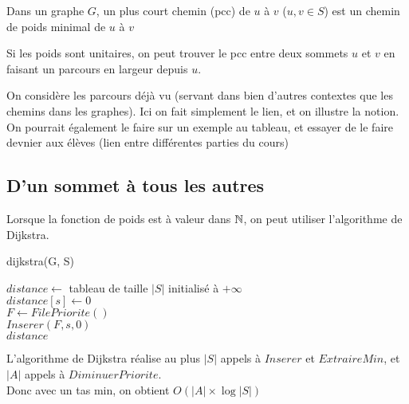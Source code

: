 \begin{definition}
	Dans un graphe $G$, un plus court chemin (pcc) de $u$ à $v$ ($u,v\in S$) est un chemin de poids minimal de $u$ à $v$
\end{definition}

\begin{rem}
	Si les poids sont unitaires, on peut trouver le pcc entre deux sommets $u$ et $v$ en faisant un parcours en largeur depuis $u$.
\end{rem}

\begin{com}
	On considère les parcours déjà vu (servant dans bien d'autres contextes que les chemins dans les graphes). Ici on fait simplement le lien, et on illustre la notion. On pourrait également le faire sur un exemple au tableau, et essayer de le faire devnier aux élèves (lien entre différentes parties du cours)
\end{com}

\subsection{D'un sommet à tous les autres}

Lorsque la fonction de poids est à valeur dans $\mathbb{N}$, on peut utiliser l'algorithme de Dijkstra.

\begin{algo}
	\begin{algorithm}
		\caption{dijkstra(G, S)}
		$distance \gets $ tableau de taille $|S|$ initialisé à $+\infty$\\
		$distance[s] \gets 0$\\	
		$F \gets FilePriorite()$\\
		$Inserer(F, s, 0)$\\
		\Retour $distance$
	\end{algorithm}
\end{algo}

\begin{proposition}
	L’algorithme de Dijkstra réalise au plus $|S|$ appels à $Inserer$ et $ExtraireMin$, et $|A|$ appels à $DiminuerPriorite$.\\
	Donc avec un tas min, on obtient $O(|A| \times \log |S|)$
\end{proposition}

